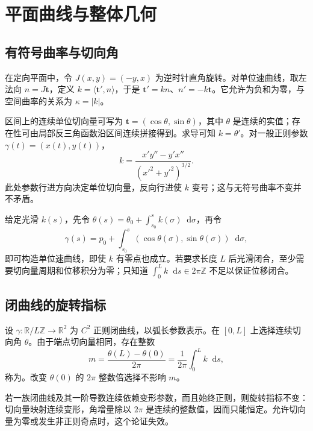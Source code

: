 \documentclass[UTF8,12pt,a4paper,fontset=fandol]{ctexbook}
\newcommand{\R}{\mathbb R}
\newcommand{\dd}{\mathop{}\!\mathrm d}
\newcommand{\ip}[2]{\langle #1,#2\rangle}
\begin{document}
\chapter{平面曲线与整体几何}
\label{chap:dg-plane}

\section{有符号曲率与切向角}
在定向平面中，令 $J(x,y)=(-y,x)$ 为逆时针直角旋转。对单位速曲线，取左法向 $n=J\mathbf t$，定义 $k=\ip{\mathbf t'}n$，于是 $\mathbf t'=kn$、$n'=-k\mathbf t$。它允许为负和为零，与空间曲率的关系为 $\kappa=|k|$。

区间上的连续单位切向量可写为 $\mathbf t=(\cos\theta,\sin\theta)$，其中 $\theta$ 是连续的实值；存在性可由局部反三角函数沿区间连续拼接得到。求导可知 $k=\theta'$。对一般正则参数 $\gamma(t)=(x(t),y(t))$，
\begin{equation}
 k=\frac{x'y''-y'x''}{(x'^2+y'^2)^{3/2}}.
 \label{eq:dg-signed-curvature}
\end{equation}
此处参数行进方向决定单位切向量，反向行进使 $k$ 变号；这与无符号曲率不变并不矛盾。

给定光滑 $k(s)$，先令 $\theta(s)=\theta_0+\int_{s_0}^s k(\sigma)\dd\sigma$，再令
\[
 \gamma(s)=p_0+\int_{s_0}^s(\cos\theta(\sigma),\sin\theta(\sigma))\dd\sigma,
\]
即可构造单位速曲线，即使 $k$ 有零点也成立。若要求长度 $L$ 后光滑闭合，至少需要切向量周期和位移积分为零；只知道 $\int_0^L k\dd s\in2\pi\mathbb Z$ 不足以保证位移闭合。

\section{闭曲线的旋转指标}
\begin{definition}[旋转指标]
设 $\gamma:\R/L\mathbb Z\to\R^2$ 为 $C^2$ 正则闭曲线，以弧长参数表示。在 $[0,L]$ 上选择连续切向角 $\theta$。由于端点切向量相同，存在整数
\[
 m=\frac{\theta(L)-\theta(0)}{2\pi}
   =\frac1{2\pi}\int_0^L k\dd s,
\]
称为。改变 $\theta(0)$ 的 $2\pi$ 整数倍选择不影响 $m$。
\end{definition}
若一族闭曲线及其一阶导数连续依赖变形参数，而且始终正则，则旋转指标不变：切向量映射连续变形，角增量除以 $2\pi$ 是连续的整数值，因而只能恒定。允许切向量为零或发生非正则奇点时，这个论证失效。
\end{document}
